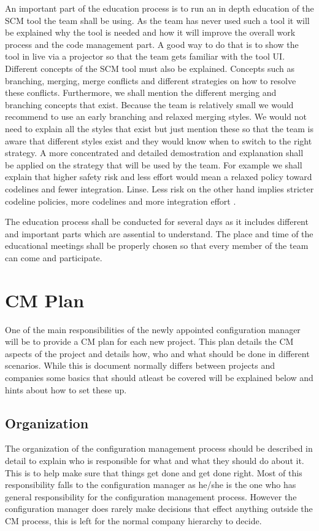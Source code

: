 \documentclass[a4paper]{article}
\begin{document}
An important part of the education process is to run an in depth education of the SCM tool the team shall be using. As the team has never used such a tool it will be explained why the tool is needed and how it will improve the overall work process and the code management part. A good way to do that is to show the tool in live via a projector so that the team gets familiar with the tool UI. Different concepts of the SCM tool must also be explained. Concepts such as branching, merging, merge conflicts and different strategies on how to resolve these conflicts. Furthermore, we shall mention the different merging and branching concepts that exist. Because the team is relatively small we would recommend to use an early branching and relaxed merging styles. We would not need to explain all the styles that exist but just mention these so that the team is aware that different styles exist and they would know when to switch to the right strategy. A more concentrated and detailed demostration and explanation shall be applied on the strategy that will be used by the team. For example we shall explain that higher safety risk and less effort would mean a relaxed policy toward codelines and fewer integration. Linse. Less risk on the other hand implies stricter codeline policies, more codelines and more integration effort \cite{mikkelsen-pherigo}.

The education process shall be conducted for several days as it includes different and important parts which are assential to understand. The place and time of the educational meetings shall be properly chosen so that every member of the team can come and participate.


\section{CM Plan}
One of the main responsibilities of the newly appointed configuration manager will be to provide a CM plan for each new project. This plan details the CM aspects of the project and details how, who and what should be done in different scenarios. While this is document normally differs between projects and companies some basics that should atleast be covered will be explained below and hints about how to set these up. 

\subsection{Organization}
The organization of the configuration management process should be described in detail to explain who is responsible for what and what they should do about it. This is to help make sure that things get done and get done right. Most of this responsibility falls to the configuration manager as he/she is the one who has general responsibility for the configuration management process. However the configuration manager does rarely make decisions that effect anything outside the CM process, this is left for the normal company hierarchy to decide.
\end{document}
